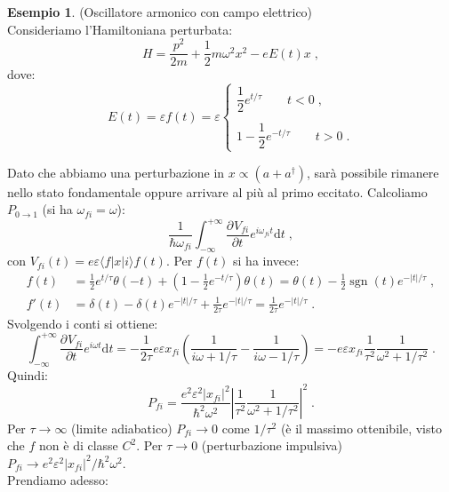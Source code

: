 \documentclass[12pt,a4paper]{report}
\theoremstyle{definition}
\newtheorem{exm}{Esempio}
\newcommand{\pdev}[3][]{\frac{\partial^{#1} #2}{\partial #3^{#1}}}
\numberwithin{equation}{section}
\newcommand{\diff}[1][]{\mathrm{d}#1}
\newcommand{\bra}{\langle}
\newcommand{\ket}{\rangle}
\newcommand{\adj}[1]{#1^{\dagger}}
\begin{document}
\begin{exm} (Oscillatore armonico con campo elettrico) \\
Consideriamo l'Hamiltoniana perturbata:
\begin{equation*}
H=\frac{p^2}{2m}+\frac{1}{2}m\omega^2x^2-eE(t)x\;,
\end{equation*}
dove:
\begin{equation*}
E(t)=\varepsilon f(t)=\varepsilon\begin{cases}
\dfrac{1}{2}e^{t/\tau}\qquad t<0\;, \\
\\
1-\dfrac{1}{2}e^{-t/\tau}\qquad t>0\;.
\end{cases}
\end{equation*}

Dato che abbiamo una perturbazione in $x\propto (a+\adj{a})$, sarà possibile rimanere nello stato fondamentale oppure arrivare al più al primo eccitato. Calcoliamo $P_{0\to 1}$ (si ha $\omega_{fi}=\omega$):
\begin{equation*}
\frac{1}{\hbar\omega_{fi}}\int_{-\infty}^{+\infty} \pdev{V_{fi}}{t}e^{i\omega_{fi}t}\diff{t}\;,
\end{equation*}
con $V_{fi}(t)=e\varepsilon\bra f|x|i\ket f(t)$. Per $f(t)$ si ha invece:
\begin{align*}
f(t) &= \frac{1}{2}e^{t/\tau}\theta(-t)+\left(1-\frac{1}{2}e^{-t/\tau}\right)\theta(t)= \theta(t)-\frac{1}{2}\operatorname{sgn}(t)e^{-|t|/\tau}\;, \\
f'(t) &= \delta(t)-\delta(t)e^{-|t|/\tau}+\frac{1}{2\tau}e^{-|t|/\tau}=\frac{1}{2\tau}e^{-|t|/\tau}\;.
\end{align*}
Svolgendo i conti si ottiene:
\begin{equation*}
\int_{-\infty}^{+\infty}\pdev{V_{fi}}{t}e^{i\omega t}\diff{t}=-\frac{1}{2\tau}e\varepsilon x_{fi}\left(\frac{1}{i\omega +1/\tau}-\frac{1}{i\omega-1/\tau}\right)=-e\varepsilon x_{fi}\frac{1}{\tau^2}\frac{1}{\omega^2+1/\tau^2}\;.
\end{equation*}
Quindi:
\begin{equation*}
P_{fi}=\frac{e^2\varepsilon^2|x_{fi}|^2}{\hbar^2\omega^2}\left|\frac{1}{\tau^2}\frac{1}{\omega^2+1/\tau^2}\right|^2\;.
\end{equation*}
Per $\tau\to\infty$ (limite adiabatico) $P_{fi}\to0$ come $1/\tau^2$ (è il massimo ottenibile, visto che $f$ non è di classe $C^2$. Per $\tau\to 0$ (perturbazione impulsiva) $P_{fi}\to e^2\varepsilon^2|x_{fi}|^2/\hbar^2\omega^2$. \\
Prendiamo adesso:

\end{exm}
\end{document}
